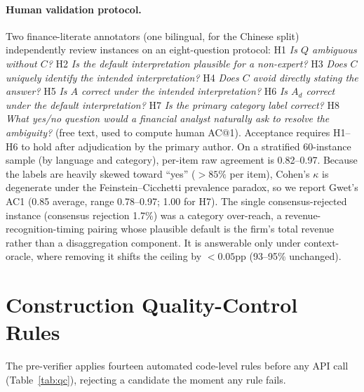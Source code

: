 \paragraph{Human validation protocol.}
Two finance-literate annotators (one bilingual, for the Chinese split) independently review
instances on an eight-question protocol: H1 \emph{Is $Q$ ambiguous without $C$?} H2 \emph{Is the
default interpretation plausible for a non-expert?} H3 \emph{Does $C$ uniquely identify the intended
interpretation?} H4 \emph{Does $C$ avoid directly stating the answer?} H5 \emph{Is $A$ correct under
the intended interpretation?} H6 \emph{Is $A_d$ correct under the default interpretation?} H7
\emph{Is the primary category label correct?} H8 \emph{What yes/no question would a financial analyst
naturally ask to resolve the ambiguity?} (free text, used to compute human AC@1). Acceptance
requires H1--H6 to hold after adjudication by the primary author. On a stratified 60-instance sample
(by language and category), per-item raw agreement is 0.82--0.97. Because the labels are heavily
skewed toward ``yes'' ($>85\%$ per item), Cohen's $\kappa$ is degenerate under the
Feinstein--Cicchetti prevalence paradox, so we report Gwet's AC1 (0.85 average, range
0.78--0.97; 1.00 for H7). The single consensus-rejected instance (consensus rejection
1.7\%) was a category over-reach, a revenue-recognition-timing pairing whose plausible default is
the firm's total revenue rather than a disaggregation component. It is answerable only under
context-oracle, where removing it shifts the ceiling by $<\!0.05$pp (93--95\% unchanged).

\section{Construction Quality-Control Rules}
\label{app:qc}

The pre-verifier applies fourteen automated code-level rules before any API call (Table~\ref{tab:qc}), rejecting a candidate the moment any rule fails.

